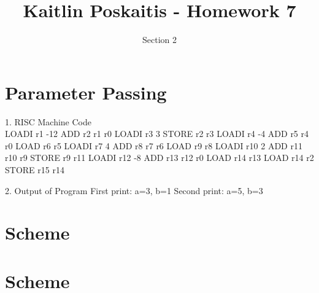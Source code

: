 \documentclass[11pt]{article}
\title{\bf Kaitlin Poskaitis - Homework 7}
\author{Section 2}
\date{}
\begin{document}
\maketitle

\section{Parameter Passing}

1. RISC Machine Code\\
\indent LOADI r1 -12 %
\indent ADD r2 r1 r0 %
\indent LOADI r3 3 %
\indent STORE r2 r3 %
\indent LOADI r4 -4 %
\indent ADD r5 r4 r0 %
\indent LOAD r6 r5 %
\indent LOADI r7 4 %
\indent ADD r8 r7 r6 %
\indent LOAD r9 r8 %
\indent LOADI r10 2 %
\indent ADD r11 r10 r9 %
\indent STORE r9 r11 %
\indent LOADI r12 -8 %
\indent ADD r13 r12 r0 %
\indent LOAD r14 r13 %
\indent LOAD r14 r2 %
\indent STORE r15 r14 %

2. Output of Program 
\indent First print: a=3, b=1
\indent Second print: a=5, b=3

\section{Scheme}

\section{Scheme}
\end{document}
